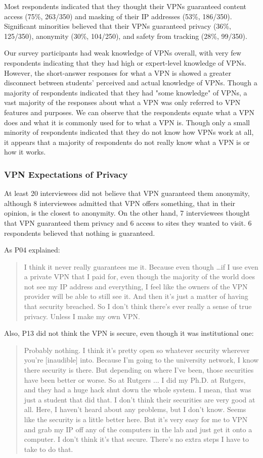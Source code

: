 Most respondents indicated that they thought their VPNs guaranteed content access (75\%, 263/350) and masking of their IP addresses (53\%, 186/350). Significant minorities believed that their VPNs guaranteed privacy (36\%, 125/350), anonymity (30\%, 104/250), and safety from tracking (28\%, 99/350).

Our survey participants had weak knowledge of VPNs overall, with very few respondents indicating that they had high or expert-level knowledge of VPNs. However, the short-answer responses for what a VPN is showed a greater disconnect between students’ perceived and actual knowledge of VPNs. Though a majority of respondents indicated that they had "some knowledge" of VPNs, a vast majority of the responses about what a VPN was only referred to VPN features and purposes. We can observe that the respondents equate what a VPN does and what it is commonly used for to what a VPN is. Though only a small minority of respondents indicated that they do not know how VPNs work at all, it appears that a majority of respondents do not really know what a VPN is or how it works.


\subsubsection{VPN Expectations of Privacy}
At least 20 interviewees did not believe that VPN guaranteed them anonymity, although 8 interviewees admitted that VPN offers something, that in their opinion, is the closest to anonymity. On the other hand, 7 interviewees thought that VPN guaranteed them privacy and 6 access to sites they wanted to visit. 6 respondents believed that nothing is guaranteed.

As P04 explained:
\begin{quote}I think it never really guarantees me it. Because even though \dots if I use even a private VPN that I paid for, even though the majority of the world does not see my IP address and everything, I feel like the owners of the VPN provider will be able to still see it. And then it's just a matter of having that security breached. So I don't think there's ever really a sense of true privacy. Unless I make my own VPN.\end{quote}


Also, P13 did not think the VPN is secure, even though it was institutional one:
\begin{quote}Probably nothing. I think it's pretty open so whatever security wherever you're [inaudible] into. Because I'm going to the university network, I know there security is there. But depending on where I've been, those securities have been better or worse. So at Rutgers ... I did my Ph.D. at Rutgers, and they had a huge hack shut down the whole system. I mean, that was just a student that did that. I don't think their securities are very good at all. Here, I haven't heard about any problems, but I don't know. Seems like the security is a little better here. But it's very easy for me to VPN and grab my IP off any of the computers in the lab and just get it onto a computer. I don't think it's that secure. There's no extra steps I have to take to do that.\end{quote}


